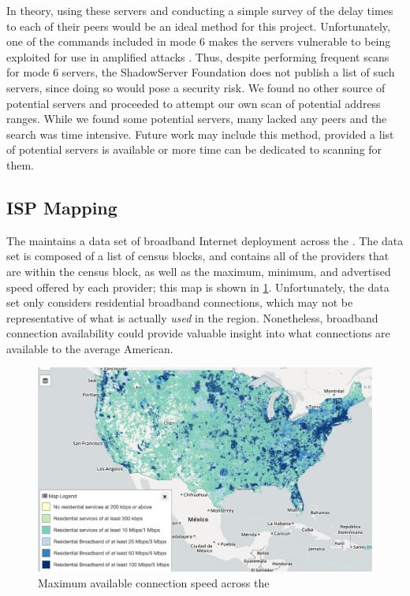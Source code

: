 In theory, using these servers and conducting a simple survey of the delay times to each of their peers would be an ideal method for this project. Unfortunately, one of the commands included in mode 6 makes the servers vulnerable to being exploited for use in amplified \ddos attacks \cite{USDepartmentofHomelandSecurity2014NTPCVE-2013-5211}. Thus, despite performing frequent scans for mode 6 servers, the ShadowServer Foundation does not publish a list of such servers, since doing so would pose a security risk. We found no other source of potential servers and proceeded to attempt our own scan of potential \ip address ranges. While we found some potential servers, many lacked any peers and the search was time intensive. Future work may include this method, provided a list of potential servers is available or more time can be dedicated to scanning for them.

\subsection{ISP Mapping}
The \FCC maintains a data set of broadband Internet deployment across the \us \cite{FederalCommunicationsCommission}. The data set is composed of a list of census blocks, and contains all of the providers that are within the census block, as well as the maximum, minimum, and advertised speed offered by each provider; this map is shown in \cref{fig:broadband_map}. Unfortunately, the data set only considers residential broadband connections, which may not be representative of what is actually \textit{used} in the region. Nonetheless, broadband connection availability could provide valuable insight into what connections are available to the average American.

\begin{figure}
    \centering
    \includegraphics{images/other/FCC_Fixed_Broadmand_map.png}
    \caption{Maximum available connection speed across the \us}
    \label{fig:broadband_map}
\end{figure}

